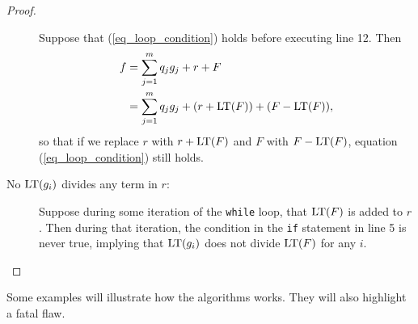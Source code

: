 \begin{proof}
\begin{description}
      Suppose that (\ref{eq_loop_condition}) holds before executing line 12. Then
      \begin{align*}
        f &= \sum_{j=1}^m q_j g_j + r + F \\
          &= \sum_{j=1}^m q_j g_j + (r + \operatorname{LT}(F)) + (F - \operatorname{LT}(F)),
      \end{align*}
      so that if we replace $r$ with $r + \operatorname{LT}(F)$ and $F$ with $F - \operatorname{LT}(F)$, equation (\ref{eq_loop_condition}) still holds.
      
    \item [No $\operatorname{LT}(g_i)$ divides any term in $r$:]
      Suppose during some iteration of the {\tt while} loop, that $\operatorname{LT}(F)$ is added to $r$.
      Then during that iteration, the condition in the {\tt if} statement in line 5 is never true,
      implying that $\operatorname{LT}(g_i)$ does not divide $\operatorname{LT}(F)$ for any $i$.
  \end{description}
\end{proof}

Some examples will illustrate how the algorithms works.
They will also highlight a fatal flaw.


